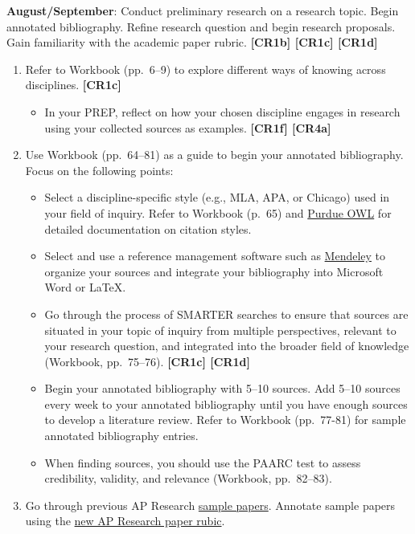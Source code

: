 \documentclass[11pt,]{article}
\providecommand{\tightlist}{%
  \setlength{\itemsep}{0pt}\setlength{\parskip}{0pt}}
\begin{document}
\textbf{August/September}: Conduct preliminary research on a research topic. Begin annotated bibliography. Refine research question and begin research proposals. Gain familiarity with the academic paper rubric. \textbf{{[}CR1b{]} {[}CR1c{]} {[}CR1d{]}}   

\begin{enumerate}
\def\labelenumi{\arabic{enumi}.}
\setcounter{enumi}{3}
\item
  Refer to Workbook (pp.~6--9) to explore different ways of knowing across disciplines. \textbf{{[}CR1c{]}} 

  \begin{itemize}
  \tightlist
  \item
    In your PREP, reflect on how your chosen discipline engages in research using your collected sources as examples. \textbf{{[}CR1f{]} {[}CR4a{]}}  
  \end{itemize}
\item
  Use Workbook (pp.~64--81) as a guide to begin your annotated bibliography. Focus on the following points:

  \begin{itemize}
  \tightlist
  \item
    Select a discipline-specific style (e.g., MLA, APA, or Chicago) used in your field of inquiry. Refer to Workbook (p.~65) and \href{https://owl.purdue.edu/owl/purdue_owl.html}{Purdue OWL} for detailed documentation on citation styles.
  \item
    Select and use a reference management software such as \href{https://www.mendeley.com}{Mendeley} to organize your sources and integrate your bibliography into Microsoft Word or LaTeX.
  \item
    Go through the process of SMARTER searches to ensure that sources are situated in your topic of inquiry from multiple perspectives, relevant to your research question, and integrated into the broader field of knowledge (Workbook, pp.~75--76). \textbf{{[}CR1c{]} {[}CR1d{]}}  
  \item
    Begin your annotated bibliography with 5--10 sources. Add 5--10 sources every week to your annotated bibliography until you have enough sources to develop a literature review. Refer to Workbook (pp.~77-81) for sample annotated bibliography entries.
  \item
    When finding sources, you should use the PAARC test to assess credibility, validity, and relevance (Workbook, pp.~82--83).
  \end{itemize}
\item
  Go through previous AP Research \href{https://apcentral.collegeboard.org/courses/ap-research/exam/past-exam-questions?course=ap-research}{sample papers}. Annotate sample papers using the \href{https://apcentral.collegeboard.org/pdf/ap18-sg-research-academic-paper.pdf}{new AP Research paper rubic}.
\end{enumerate}
\end{document}
